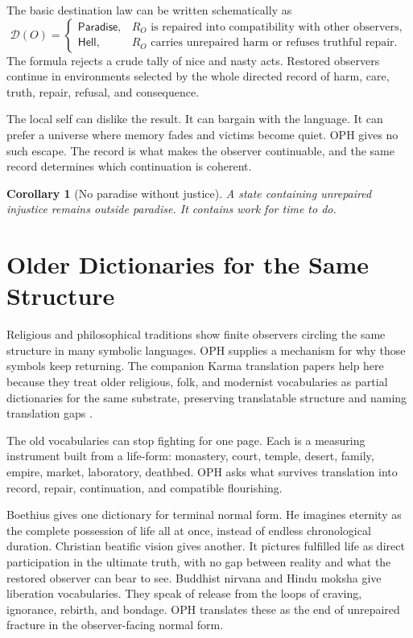 \documentclass[11pt]{article}
\newtheorem{corollary}[definition]{Corollary}
\theoremstyle{remark}
\theoremstyle{plain}
\newcommand{\Dest}{\mathcal D}
\begin{document}
The basic destination law can be written schematically as
\[
\Dest(O)=
\begin{cases}
\mathsf{Paradise}, & R_O \text{ is repaired into compatibility with other observers},\\
\mathsf{Hell}, & R_O \text{ carries unrepaired harm or refuses truthful repair}.
\end{cases}
\]
The formula rejects a crude tally of nice and nasty acts. Restored observers
continue in environments selected by the whole directed record of harm, care,
truth, repair, refusal, and consequence.

The local self can dislike the result. It can bargain with the language. It can
prefer a universe where memory fades and victims become quiet. OPH gives no
such escape. The record is what makes the observer continuable, and the same
record determines which continuation is coherent.

\begin{corollary}[No paradise without justice]
A state containing unrepaired injustice remains outside paradise. It contains
work for time to do.
\end{corollary}

\section{Older Dictionaries for the Same Structure}

Religious and philosophical traditions show finite observers circling the same
structure in many symbolic languages. OPH supplies a mechanism for why those
symbols keep returning.
The companion Karma translation papers help here because they treat older
religious, folk, and modernist vocabularies as partial dictionaries for the
same substrate, preserving translatable structure and naming translation gaps
\cite{KarmaRight,KarmaWrong}.

The old vocabularies can stop fighting for one page. Each is a measuring
instrument built from a life-form: monastery, court, temple, desert, family,
empire, market, laboratory, deathbed. OPH asks what survives translation into
record, repair, continuation, and compatible flourishing.

Boethius gives one dictionary for terminal normal form. He imagines eternity as
the complete possession of life all at once, instead of endless chronological
duration. Christian beatific vision gives another. It pictures fulfilled life as
direct participation in the ultimate truth, with no gap between reality and what
the restored observer can bear to see. Buddhist nirvana and Hindu moksha give
liberation vocabularies. They speak of release from the loops of craving,
ignorance, rebirth, and bondage. OPH translates these as the end of unrepaired
fracture in the observer-facing normal form.
\end{document}
